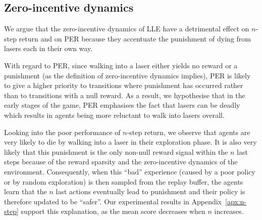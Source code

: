 \subsection{Zero-incentive dynamics}
\label{sec:discussion-zid}
We argue that the zero-incentive dynamics of LLE have a detrimental effect on $n$-step return and on PER because they accentuate the punishment of dying from lasers each in their own way.

With regard to PER, since walking into a laser either yields no reward or a punishment (as the definition of zero-incentive dynamics implies), PER is likely to give a higher priority to transitions where punishment has occurred rather than to transitions with a null reward. As a result, we hypothesise that in the early stages of the game, PER emphasises the fact that lasers can be deadly which results in agents being more reluctant to walk into lasers overall.

Looking into the poor performance of $n$-step return, we observe that agents are very likely to die by walking into a laser in their exploration phase. It is also very likely that this punishment is the only non-null reward signal within the $n$ last steps because of the reward sparsity and the zero-incentive dynamics of the environment.  Consequently, when this ``bad'' experience (caused by a poor policy or by random exploration) is then sampled from the replay buffer, the agents learn that the $n$ last actions eventually lead to punishment and their policy is therefore updated to be ``safer''. Our experimental results in Appendix~\ref{apx:n-step} support this explanation, as the mean score decreases when $n$ increases.

